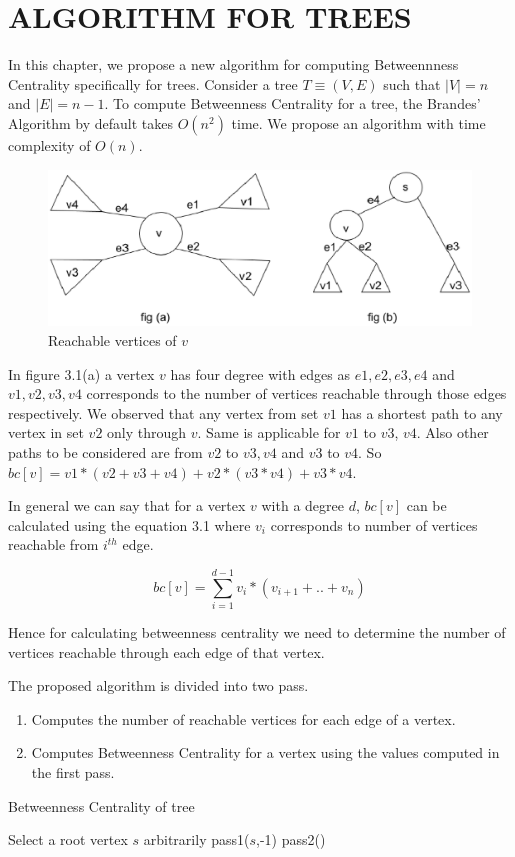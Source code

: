 \chapter{ALGORITHM FOR TREES}
\label{chap:dpp}

In this chapter, we propose a new algorithm for computing Betweennness Centrality specifically for trees. Consider a tree $T \equiv (V,E)$ such that $|V|=n$ and $|E|=n-1$.
To compute Betweenness Centrality for a tree, the Brandes' Algorithm by default takes $O(n^2)$ time.
We propose an algorithm with time complexity of $O(n)$.


\begin{figure}[htp]
\centering
\includegraphics[width=13cm]{images/tree1.eps}
\caption{Reachable vertices of $v$}
\label{fig:lion}
\end{figure}

In figure 3.1(a) a vertex $v$ has four degree with edges as $e1,e2,e3,e4$ and $v1,v2,v3,v4$ corresponds to the number of vertices reachable through those edges respectively. We observed that any vertex from set $v1$ has a shortest path to any vertex in set $v2$ only through $v$. Same is applicable for $v1$ to $v3$, $v4$. Also other paths to be considered are from $v2$ to $v3, v4$ and $v3$ to $v4$.
So $bc[v] = v1*(v2+v3+v4) + v2*(v3*v4) + v3*v4$.

In general we can say that for a vertex $v$ with a degree $d$, $bc[v]$ can be calculated using the equation 3.1 where $v_{i}$ corresponds to number of vertices reachable from $i_{}^{th}$ edge.

\begin{equation} \label{eq4}
bc[v] = \sum_{i=1}^{d-1} v_{i}*(v_{i+1}+..+v_{n})
\end{equation}

Hence for calculating betweenness centrality we need to determine the number of vertices reachable through each edge of that vertex.

The proposed algorithm is divided into two pass.
\vspace{-0.5em}
\begin{enumerate}

  \item Computes the number of reachable vertices for each edge of a vertex.
  \item Computes Betweenness Centrality for a vertex using the values computed in the first pass.
\end{enumerate}
\begin{algorithm}
\caption{Betweenness Centrality of tree}
Select a root vertex $s$ arbitrarily\;
pass1($s$,-1)\;
pass2()\;
\end{algorithm}


